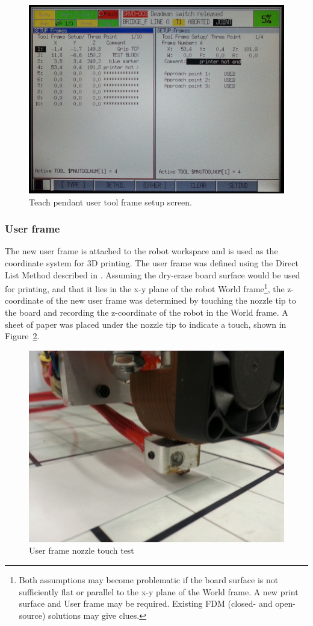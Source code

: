 \begin{figure}
    \centering
    \includegraphics[width=.8\linewidth]{figures/tp-screens/utool}
    \caption{Teach pendant user tool frame setup screen.}
    \label{fig:utool}
\end{figure}

\subsubsection{User frame}
The new user frame is attached to the robot workspace and is used as the coordinate system for 3D printing. The user frame was defined using the Direct List Method described in \cite[sec~3.9.2]{lr-handling-tool}. Assuming the dry-erase board surface would be used for printing, and that it lies in the x-y plane of the robot World frame\footnote{Both assumptions may become problematic if the board surface is not sufficiently flat or parallel to the x-y plane of the World frame. A new print surface and User frame may be required. Existing FDM (closed- and open-source) solutions may give clues.}, the z-coordinate of the new user frame was determined by touching the nozzle tip to the board and recording the z-coordinate of the robot in the World frame. A sheet of paper was placed under the nozzle tip to indicate a touch, shown in Figure~\ref{fig:nozzle-touch}. 

\begin{figure}
    \centering
    \includegraphics[width=.8\linewidth]{figures/nozzle-paper}
    \caption{User frame nozzle touch test}
    \label{fig:nozzle-touch}
\end{figure}

